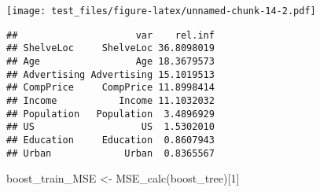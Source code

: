 \documentclass[
]{article}
\newenvironment{Shaded}{\begin{snugshade}}{\end{snugshade}}
\newcommand{\AttributeTok}[1]{\textcolor[rgb]{0.77,0.63,0.00}{#1}}
\newcommand{\ControlFlowTok}[1]{\textcolor[rgb]{0.13,0.29,0.53}{\textbf{#1}}}
\newcommand{\DecValTok}[1]{\textcolor[rgb]{0.00,0.00,0.81}{#1}}
\newcommand{\FloatTok}[1]{\textcolor[rgb]{0.00,0.00,0.81}{#1}}
\newcommand{\FunctionTok}[1]{\textcolor[rgb]{0.00,0.00,0.00}{#1}}
\newcommand{\NormalTok}[1]{#1}
\newcommand{\OtherTok}[1]{\textcolor[rgb]{0.56,0.35,0.01}{#1}}
\newcommand{\SpecialCharTok}[1]{\textcolor[rgb]{0.00,0.00,0.00}{#1}}
\newcommand{\StringTok}[1]{\textcolor[rgb]{0.31,0.60,0.02}{#1}}
\begin{document}
\begin{Shaded}
\end{Shaded}

\texttt{[image: test\_files/figure-latex/unnamed-chunk-14-2.pdf]}

\begin{verbatim}
##                     var    rel.inf
## ShelveLoc     ShelveLoc 36.8098019
## Age                 Age 18.3679573
## Advertising Advertising 15.1019513
## CompPrice     CompPrice 11.8998414
## Income           Income 11.1032032
## Population   Population  3.4896929
## US                   US  1.5302010
## Education     Education  0.8607943
## Urban             Urban  0.8365567
\end{verbatim}

\begin{Shaded}
\begin{Highlighting}[]
\NormalTok{boost\_train\_MSE }\OtherTok{\textless{}{-}} \FunctionTok{MSE\_calc}\NormalTok{(boost\_tree)[}\DecValTok{1}\NormalTok{]}
\end{Highlighting}
\end{Shaded}
\end{document}
